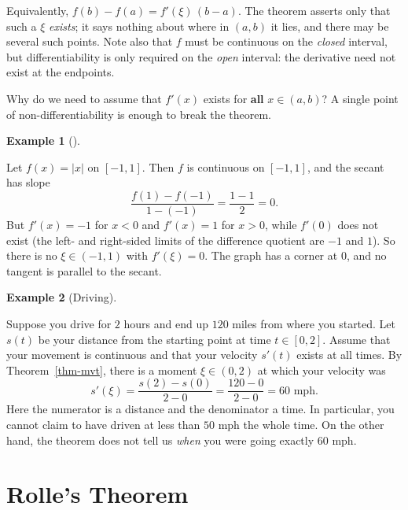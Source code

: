 \documentclass[
  letterpaper,
  DIV=11,
  numbers=noendperiod]{scrreprt}
\theoremstyle{plain}
\theoremstyle{plain}
\theoremstyle{definition}
\theoremstyle{definition}
\theoremstyle{definition}
\newtheorem{example}{Example}[chapter]
\theoremstyle{plain}
\theoremstyle{plain}
\theoremstyle{remark}
\begin{document}
Equivalently, \(f(b)-f(a) = f'(\xi)\,(b-a)\). The theorem asserts only
that such a \(\xi\) \emph{exists}; it says nothing about where in
\((a,b)\) it lies, and there may be several such points. Note also that
\(f\) must be continuous on the \emph{closed} interval, but
differentiability is only required on the \emph{open} interval: the
derivative need not exist at the endpoints.

Why do we need to assume that \(f'(x)\) exists for \textbf{all}
\(x\in(a,b)\)? A single point of non-differentiability is enough to
break the theorem.

\begin{example}[]\protect\hypertarget{exm-abs-no-mvt}{}\label{exm-abs-no-mvt}

\hfill\break
Let \(f(x) = \lvert x \rvert\) on \([-1,1]\). Then \(f\) is continuous
on \([-1,1]\), and the secant has slope \[
\frac{f(1)-f(-1)}{1-(-1)} = \frac{1-1}{2} = 0 .
\] But \(f'(x) = -1\) for \(x<0\) and \(f'(x)=1\) for \(x>0\), while
\(f'(0)\) does not exist (the left- and right-sided limits of the
difference quotient are \(-1\) and \(1\)). So there is no
\(\xi\in(-1,1)\) with \(f'(\xi)=0\). The graph has a corner at \(0\),
and no tangent is parallel to the secant.

\end{example}

\begin{example}[Driving]\protect\hypertarget{exm-driving}{}\label{exm-driving}

\hfill\break
Suppose you drive for \(2\) hours and end up \(120\) miles from where
you started. Let \(s(t)\) be your distance from the starting point at
time \(t\in[0,2]\). Assume that your movement is continuous and that
your velocity \(s'(t)\) exists at all times. By Theorem~\ref{thm-mvt},
there is a moment \(\xi\in(0,2)\) at which your velocity was \[
s'(\xi) = \frac{s(2)-s(0)}{2-0} = \frac{120-0}{2-0} = 60 \text{ mph}.
\] Here the numerator is a distance and the denominator a time. In
particular, you cannot claim to have driven at less than \(50\) mph the
whole time. On the other hand, the theorem does not tell us \emph{when}
you were going exactly \(60\) mph.

\end{example}

\section{Rolle's Theorem}\label{rolles-theorem}
\end{document}
